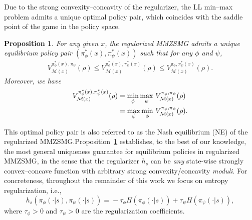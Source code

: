 \documentclass{article}
\theoremstyle{plain}
\newtheorem{proposition}{Proposition}
\theoremstyle{definition}
\theoremstyle{remark}
\def\R{\mathbb R}
\def\cA{\mathcal A}
\def\cB{\mathcal B}
\def\cM{\mathcal M}
\def\cS{\mathcal S}
\begin{document}
Due to the strong convexity--concavity of the regularizer, the LL min--max problem admits a unique optimal policy pair, which coincides with the saddle
point of the game in the policy space.
\begin{proposition}
    \label{proposition: existence-and-uniqueness-of-equilibrium-main}
    For any given $x$, 
    the regularized MMZSMG admits a unique equilibrium policy pair $(\pi_\phi^*(x), \pi_\psi^*(x))$ such that for any $\phi$ and $\psi$,
    \begin{align}
        V^{\pi_\phi^*(x),\pi_\psi}_{\cM(x)}(\rho) \leq  V^{\pi_\phi^*(x),\pi_\psi^*(x)}_{\cM(x)}(\rho)\leq V^{\pi_\phi,\pi_\psi^*(x)}_{\cM(x)}(\rho).
    \end{align}
    Moreover, we have 
\vspace{-2mm}
\begin{align}\notag
V^{\pi_\phi^*(x),\pi_\psi^*(x)}_{\cM(x)}(\rho) 
&= \min_{\phi} \max_{\psi} \, V^{\pi_\phi,\pi_\psi}_{\cM(x)}(\rho) \\\notag
&= \max_{\psi} \min_{\phi} \, V^{\pi_\phi,\pi_\psi}_{\cM(x)}(\rho).
\end{align}
\end{proposition}

\vspace{-4mm}
This optimal policy pair is also referred to as the Nash equilibrium (NE) of the regularized MMZSMG.Proposition~\ref{proposition: existence-and-uniqueness-of-equilibrium-main} establishes, to the best of our knowledge, the most general uniqueness guarantee for equilibrium policies in regularized MMZSMG, in the sense that the regularizer $h_s$ can be \emph{any} state-wise strongly convex--concave function with arbitrary strong convexity/concavity \emph{moduli}. For concreteness, throughout the remainder of this work we focus on entropy regularization, i.e.,
\begin{equation}
\!\!\!\!h_s(\pi_\phi(\cdot|s),\!\pi_\psi(\cdot|s)) \!=\! - \tau_\phi H(\pi_\phi(\cdot|s)) +  \tau_\psi H(\pi_\psi(\cdot|s)), \label{eq: entropy-regularization}
\end{equation}
where $\tau_\phi > 0$ and $\tau_\psi > 0$ are the regularization coefficients.
\end{document}
